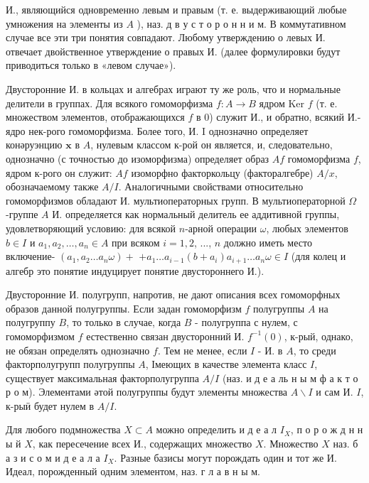 \documentclass[10pt]{article}
\begin{document}
И., являющийся одновременно левым и правым (т. е. выдерживающий любые умножения на элементы из $A$ ), наз. д в у с т о р о н н и м. В коммутативном случае все эти три понятия совпадают. Любому утверждению о левых И. отвечает двойственное утверждение о правых И. (далее формулировки будут приводиться только в «левом случае»).



Двусторонние И. в кольцах и алгебрах играют ту же роль, что и нормальные делители в группах. Для всякого гомоморфизма $f: A \rightarrow B$ ядром Ker $f$ (т. е. множеством элементов, отображающихся $f$ в 0) служит И., и обратно, всякий И.- ядро нек-рого гомоморфизма. Более того, И. I однозначно определяет конәруэнцию $\boldsymbol{x}$ в $A$, нулевым классом к-рой он является, и, следовательно, однозначно (с точностью до изоморфизма) определяет образ $A f$ гомоморфизма $f$, ядром к-рого он служит: $A f$ изоморфно факторкольцу (факторалгебре) $A / x$, обозначаемому также $A / I$. Аналогичными свойствами относительно гомоморфизмов обладают И. мультиоператорных групп. В мультиоператорной $\Omega$-группе $A$ И. определяется как нормальный делитель ее аддитивной группы, удовлетворяющий условию: для всякой $n$-арной операции $\omega$, любых элементов $b \in I$ и $a_{1}, a_{2}, \ldots, a_{n} \in A$ при всяком $i=1,2$, ..., $n$ должно иметь место включение- $\left(a_{1}, a_{2} \ldots a_{n} \omega\right)+$ $+a_{1} \ldots a_{i-1}\left(b+a_{i}\right) a_{i+1} \ldots a_{n} \omega \in I$ (для колец и алгебр это понятие индуцирует понятие двустороннего И.).



Двусторонние И. полугрупп, напротив, не дают описания всех гомоморфных образов данной полугруппы. Если задан гомоморфизм $f$ полугруппы $A$ на полугруппу $B$, то только в случае, когда $B$ - полугруппа с нулем, с гомоморфизмом $f$ естественно связан двусторонний И. $f^{-1}(0)$, к-рый, однако, не обязан определять однозначно $f$. Тем не менее, если $I$ - И. в $A$, то среди факторполугрупп полугруппы $A$, Імеющих в качестве элемента класс $I$, существует максимальная факторполугруппа $A / I$ (наз. и д е а ль н ы м ф а к т о р о м). Элементами әтой полугруппы будут элементы множества $A \backslash I$ и сам И. $I$, к-рыӥ будет нулем в $A / I$.



Для любого подмножества $X \subset A$ можно определить и д е а л $I_{X}$, п о р о ж д н н ы й $X$, как пересечение всех И., содержащих множество $X$. Множество $X$ наз. б а з и с о м и д е а л а $I_{X}$. Разные базисы могут порождать один и тот же И. Идеал, порожденный одним элементом, наз. г л а в н ы м.
\end{document}
